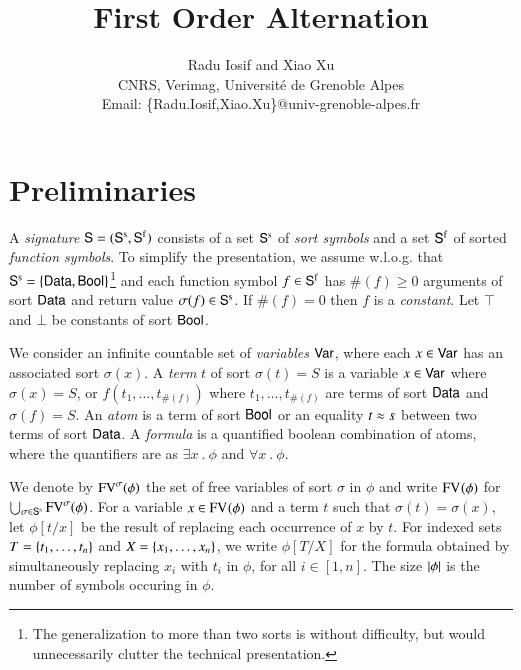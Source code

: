 \documentclass{llncs}
\begin{document}

\title{First Order Alternation}

\author{Radu Iosif and Xiao Xu \\
CNRS, Verimag, Universit\'e de Grenoble Alpes \\
Email: \{Radu.Iosif,Xiao.Xu\}@univ-grenoble-alpes.fr}

\maketitle

\begin{abstract}
\end{abstract}

\section{Preliminaries}

A \emph{signature} $\mathsf{S} = (\mathsf{S}^\mathrm{s},\mathsf{S}^\mathrm{f})$ consists of a
set $\mathsf{S}^\mathrm{s}$ of \emph{sort symbols} and a set $\mathsf{S}^\mathrm{f}$ of
sorted \emph{function symbols}. To simplify the presentation, we
assume w.l.o.g. that $\mathsf{S}^\mathrm{s} = \left\{ \mathsf{Data},\mathsf{Bool} \right\}$\footnote{The
  generalization to more than two sorts is without difficulty, but
  would unnecessarily clutter the technical presentation.} and each
function symbol $f \in \mathsf{S}^\mathrm{f}$ has $\#(f) \geq 0$ arguments of
sort $\mathsf{Data}$ and return value $\sigma(f) \in \mathsf{S}^\mathrm{s}$. If
$\#(f)=0$ then $f$ is a \emph{constant}. Let
$\top$ and $\bot$ be constants of sort $\mathsf{Bool}$.

We consider an infinite countable set of \emph{variables} $\mathsf{Var}$,
where each $x \in \mathsf{Var}$ has an associated sort $\sigma(x)$. A
\emph{term} $t$ of sort $\sigma(t)=S$ is a variable $x \in \mathsf{Var}$
where $\sigma(x)=S$, or $f(t_1,\ldots,t_{\#(f)})$ where
$t_1,\ldots,t_{\#(f)}$ are terms of sort $\mathsf{Data}$ and $\sigma(f)=S$. An
\emph{atom} is a term of sort $\mathsf{Bool}$ or an equality $t \approx s$
between two terms of sort $\mathsf{Data}$. A \emph{formula} is a quantified
boolean combination of atoms, where the quantifiers are as $\exists x
~.~ \phi$ and $\forall x ~.~ \phi$.

We denote by $\mathrm{FV}^{\sigma}(\phi)$ the set of free variables of sort
$\sigma$ in $\phi$ and write $\mathrm{FV}^{}(\phi)$ for $\bigcup_{\sigma \in
  \mathsf{S}^\mathrm{s}} \mathrm{FV}^{\sigma}(\phi)$. For a variable $x \in
\mathrm{FV}^{}(\phi)$ and a term $t$ such that $\sigma(t) = \sigma(x)$, let
$\phi[t/x]$ be the result of replacing each occurrence of $x$ by
$t$. For indexed sets $T=\left\{ t_1,\ldots,t_n \right\}$ and
$X=\left\{ x_1,\ldots,x_n \right\}$, we write $\phi[T/X]$ for
the formula obtained by simultaneously replacing $x_i$ with $t_i$ in
$\phi$, for all $i\in[1,n]$. The size ${|{\phi}|}$ is the number of
symbols occuring in $\phi$.
\end{document}
